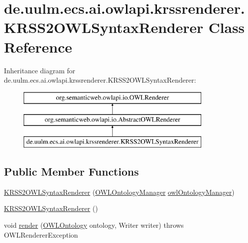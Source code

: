\hypertarget{classde_1_1uulm_1_1ecs_1_1ai_1_1owlapi_1_1krssrenderer_1_1_k_r_s_s2_o_w_l_syntax_renderer}{\section{de.\-uulm.\-ecs.\-ai.\-owlapi.\-krssrenderer.\-K\-R\-S\-S2\-O\-W\-L\-Syntax\-Renderer Class Reference}
\label{classde_1_1uulm_1_1ecs_1_1ai_1_1owlapi_1_1krssrenderer_1_1_k_r_s_s2_o_w_l_syntax_renderer}
}
Inheritance diagram for de.\-uulm.\-ecs.\-ai.\-owlapi.\-krssrenderer.\-K\-R\-S\-S2\-O\-W\-L\-Syntax\-Renderer\-:\begin{figure}[H]
\begin{center}
\leavevmode
\includegraphics[height=3.000000cm]{classde_1_1uulm_1_1ecs_1_1ai_1_1owlapi_1_1krssrenderer_1_1_k_r_s_s2_o_w_l_syntax_renderer}
\end{center}
\end{figure}
\subsection*{Public Member Functions}
\begin{DoxyCompactItemize}
\item 
\hyperlink{classde_1_1uulm_1_1ecs_1_1ai_1_1owlapi_1_1krssrenderer_1_1_k_r_s_s2_o_w_l_syntax_renderer_a29e86d54f2ea8d5cd0643f473f5bd1ca}{K\-R\-S\-S2\-O\-W\-L\-Syntax\-Renderer} (\hyperlink{interfaceorg_1_1semanticweb_1_1owlapi_1_1model_1_1_o_w_l_ontology_manager}{O\-W\-L\-Ontology\-Manager} \hyperlink{classorg_1_1semanticweb_1_1owlapi_1_1io_1_1_abstract_o_w_l_renderer_abb9888586f19a7a923cba542d99f1556}{owl\-Ontology\-Manager})
\item 
\hyperlink{classde_1_1uulm_1_1ecs_1_1ai_1_1owlapi_1_1krssrenderer_1_1_k_r_s_s2_o_w_l_syntax_renderer_a479565cff84d81678c8d765f58c96233}{K\-R\-S\-S2\-O\-W\-L\-Syntax\-Renderer} ()
\item 
void \hyperlink{classde_1_1uulm_1_1ecs_1_1ai_1_1owlapi_1_1krssrenderer_1_1_k_r_s_s2_o_w_l_syntax_renderer_a546ff2f4b8f48b859000ea6fd7afcf37}{render} (\hyperlink{interfaceorg_1_1semanticweb_1_1owlapi_1_1model_1_1_o_w_l_ontology}{O\-W\-L\-Ontology} ontology, Writer writer)  throws O\-W\-L\-Renderer\-Exception 
\end{DoxyCompactItemize}

